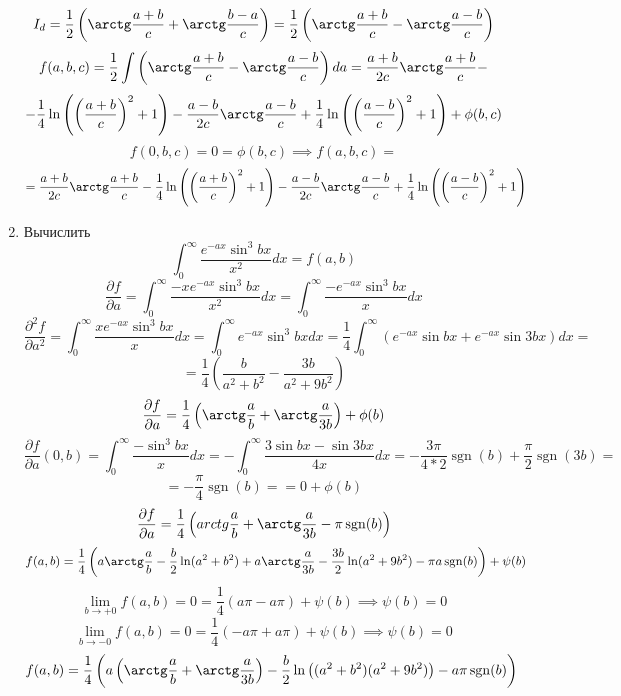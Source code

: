 \documentclass{article}
\DeclareMathOperator{\sgn}{sgn}
\begin{document}
\begin{large}
\begin{enumerate}
$$ I_d = \frac{1}{2} \left( \arctg \frac{a+b}{c} + \arctg \frac{b-a}{c} \right) = \frac{1}{2} \left( \arctg \frac{a+b}{c} - \arctg \frac{a-b}{c} \right) $$
$$ f(a,b,c) = \frac{1}{2} \int \left( \arctg \frac{a+b}{c} - \arctg \frac{a-b}{c} \right) da = \frac{a+b}{2c} \arctg \frac{a+b}{c} - $$
$$ - \frac{1}{4} \ln \left(\left(\frac{a+b}{c}\right)^2 + 1 \right) - \frac{a-b}{2c} \arctg \frac{a-b}{c} + \frac{1}{4} \ln \left(\left(\frac{a-b}{c}\right)^2 + 1 \right) + \phi(b,c)$$
$$ f(0,b,c) = 0 = \phi(b,c) \implies f(a,b,c) =$$
$$ = \frac{a+b}{2c} \arctg \frac{a+b}{c} - \frac{1}{4} \ln \left(\left(\frac{a+b}{c}\right)^2 + 1 \right) - \frac{a-b}{2c} \arctg \frac{a-b}{c} + \frac{1}{4} \ln \left(\left(\frac{a-b}{c}\right)^2 + 1 \right) $$

\item Вычислить
$$ \int_0^\infty \frac{e^{-ax} \sin^3 bx}{x^2} dx = f(a,b) $$
$$ \frac{\partial f}{\partial a} = \int_0^\infty \frac{-xe^{-ax} \sin^3 bx}{x^2} dx = \int_0^\infty \frac{-e^{-ax} \sin^3 bx}{x} dx $$
$$ \frac{\partial^2 f}{\partial a^2} = \int_0^\infty \frac{xe^{-ax} \sin^3 bx}{x} dx = \int_0^\infty e^{-ax} \sin^3 bx dx = \frac{1}{4} \int_0^\infty\left( e^{-ax} \sin bx + e^{-ax} \sin 3bx  \right) dx = $$
$$ = \frac{1}{4} \left( \frac{b}{a^2 + b^2} - \frac{3b}{a^2 + 9b^2} \right) $$
$$ \frac{\partial f}{\partial a} = \frac{1}{4} \left( \arctg \frac{a}{b} + \arctg \frac{a}{3b} \right) + \phi(b) $$
$$ \frac{\partial f}{\partial a}(0,b) = \int_0^\infty \frac{-\sin^3 bx}{x} dx = -\int_0^\infty \frac{3 \sin bx - \sin 3bx}{4x} dx = -\frac{3\pi}{4*2} \sgn(b) + \frac{\pi}{2}\sgn(3b) = $$
$$ = -\frac{\pi}{4}\sgn(b) == 0 + \phi(b) $$
$$ \frac{\partial f}{\partial a} = \frac{1}{4} \left( arctg \frac{a}{b} + \arctg \frac{a}{3b} - \pi\sgn(b) \right) $$
$$ f(a,b) = \frac{1}{4} \left( a \arctg \frac{a}{b} - \frac{b}{2} \ln(a^2+b^2) + a \arctg \frac{a}{3b} - \frac{3b}{2} \ln(a^2+9b^2) - \pi a\sgn(b) \right) + \psi(b) $$
$$ \lim_{b\to+0} f(a,b) = 0 = \frac{1}{4}\left( a\pi-a\pi \right) + \psi(b) \implies \psi(b) = 0 $$
$$ \lim_{b\to-0} f(a,b) = 0 = \frac{1}{4}\left( -a\pi+a\pi \right) + \psi(b) \implies \psi(b) = 0 $$
$$ f(a,b) = \frac{1}{4}\left( a\left( \arctg \frac{a}{b} + \arctg \frac{a}{3b} \right) - \frac{b}{2}\ln \left((a^2 + b^2)(a^2 + 9b^2)\right) - a\pi\sgn(b)\right)$$


\end{enumerate}
\end{large}
\end{document}
